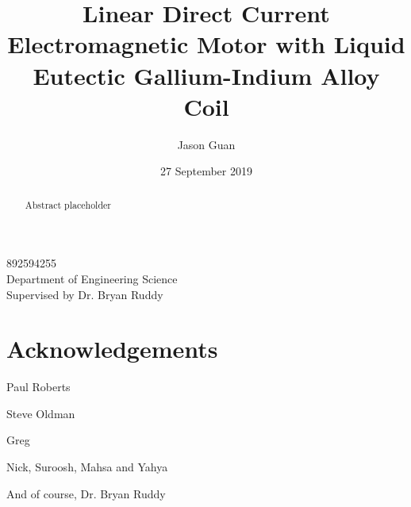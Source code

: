 \documentclass[a4paper,12pt]{article}
\title{Linear Direct Current Electromagnetic Motor with Liquid Eutectic Gallium-Indium Alloy Coil}
\author{Jason Guan}
\date{27 September 2019}
\begin{document}
\maketitle
\begin{center}
	892594255\\
	Department of Engineering Science\\
	Supervised by Dr. Bryan Ruddy
\end{center}

\newpage

\begin{abstract}
Abstract placeholder
\end{abstract}

\newpage

\section*{Acknowledgements}
Paul Roberts 

Steve Oldman 

Greg 

Nick, Suroosh, Mahsa and Yahya 

And of course, Dr. Bryan Ruddy 

\newpage

\tableofcontents

\newpage
\end{document}
